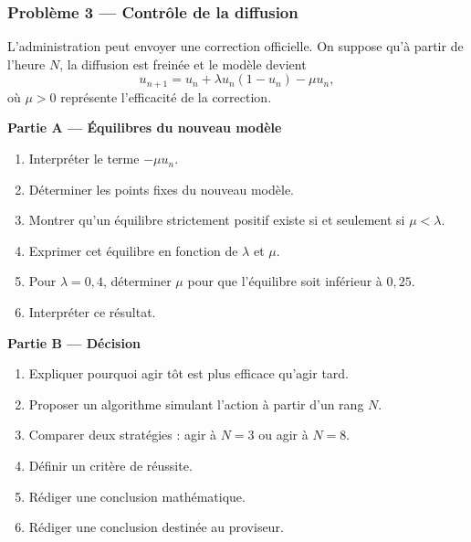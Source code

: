 \documentclass[11pt,a4paper]{article}
\begin{document}
\begin{difficile}
\subsubsection*{Problème 3 — Contrôle de la diffusion}

L'administration peut envoyer une correction officielle. On suppose qu'à partir de l'heure $N$, la diffusion est freinée et le modèle devient
\[
u_{n+1}=u_n+\lambda u_n(1-u_n)-\mu u_n,
\]
où $\mu>0$ représente l'efficacité de la correction.

\textbf{Partie A — Équilibres du nouveau modèle}
\begin{enumerate}
  \item Interpréter le terme $-\mu u_n$.
  \item Déterminer les points fixes du nouveau modèle.
  \item Montrer qu'un équilibre strictement positif existe si et seulement si $\mu<\lambda$.
  \item Exprimer cet équilibre en fonction de $\lambda$ et $\mu$.
  \item Pour $\lambda=0{,}4$, déterminer $\mu$ pour que l'équilibre soit inférieur à $0{,}25$.
  \item Interpréter ce résultat.
\end{enumerate}

\textbf{Partie B — Décision}
\begin{enumerate}
  \item Expliquer pourquoi agir tôt est plus efficace qu'agir tard.
  \item Proposer un algorithme simulant l'action à partir d'un rang $N$.
  \item Comparer deux stratégies : agir à $N=3$ ou agir à $N=8$.
  \item Définir un critère de réussite.
  \item Rédiger une conclusion mathématique.
  \item Rédiger une conclusion destinée au proviseur.
\end{enumerate}
\end{difficile}
\end{document}
